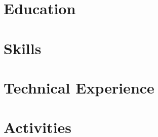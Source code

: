 \documentclass[10pt]{article}
\begin{document}
\pagestyle{others}\thispagestyle{first_page}



\section{Education}


\section{Skills}


\section{Technical Experience}



\section{Activities}

\end{document}
